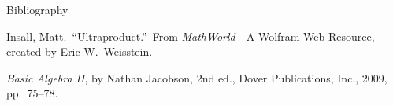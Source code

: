 \documentclass{article}
\begin{document}
\clearpage
\begin{center}
\Large{Bibliography}
\end{center}
\quad
\small{
\begin{enumerate}[label={[\arabic*]}]
\item Insall, Matt.~``Ultraproduct.''~From \emph{MathWorld}\----A Wolfram Web Resource, created by Eric W.~Weisstein.

\item \emph{Basic Algebra II}, by Nathan Jacobson, 2nd ed., Dover Publications, Inc., 2009, pp.~75–78. 
\end{enumerate}
}
\end{document}

